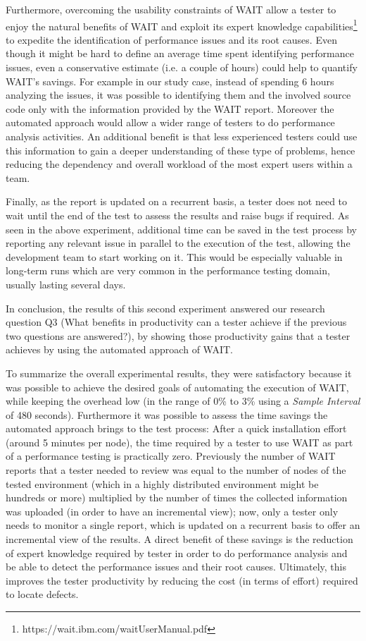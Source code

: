 \documentclass[runningheads,a4paper]{llncs}
\begin{document}
Furthermore, overcoming the usability constraints of WAIT allow a tester
to enjoy the natural benefits of WAIT and exploit its expert knowledge
capabilities\footnote{https://wait.ibm.com/waitUserManual.pdf} to expedite the
identification of performance issues and its root causes. Even though it
might be hard to define an average time spent identifying performance issues,
even a conservative estimate (i.e. a couple of hours) could help to
quantify WAIT's savings. For example in our study case, instead of spending 6
hours analyzing the issues, it was possible to identifying them and the involved
source code only with the information provided by the WAIT report. Moreover
the automated approach would allow a wider range of testers to do performance
analysis activities. An additional benefit is that less experienced testers
could use this information to gain a deeper understanding of these type of problems, 
hence reducing the dependency and overall workload of the most expert users
within a team.

Finally, as the report is updated on a recurrent basis, a tester does
not need to wait until the end of the test to assess the results and raise bugs
if required. As seen in the above experiment, additional time can be saved
in the test process by reporting any relevant issue in parallel to the
execution of the test, allowing the development team to start working on it.
This would be especially valuable in long-term runs which are very common in the 
performance testing domain, usually lasting several days.

In conclusion, the results of this second experiment answered our research
question Q3 (What benefits in productivity can a tester achieve if the previous
two questions are answered?), by showing those productivity gains that a tester
achieves by using the automated approach of WAIT.

To summarize the overall experimental results, they were satisfactory because it
was possible to achieve the desired goals of automating the execution of WAIT,
while keeping the overhead low (in the range of 0\% to 3\% using a \emph{Sample
Interval} of 480 seconds). Furthermore it was possible to assess the time
savings the automated approach brings to the test process: After a quick
installation effort (around 5 minutes per node), the time required by a tester
to use WAIT as part of a performance testing is practically zero. Previously the
number of WAIT reports that a tester needed to review was equal to the number of
nodes of the tested environment (which in a highly distributed environment
might be hundreds or more) multiplied by the number of times the collected
information was uploaded (in order to have an incremental view); now, only
a tester only needs to monitor a single report, which is updated on a recurrent
basis to offer an incremental view of the results. A direct benefit of these
savings is the reduction of expert knowledge required by tester in order to do
performance analysis and be able to detect the performance issues and their
root causes. Ultimately, this improves the tester productivity by reducing the
cost (in terms of effort) required to locate defects.
\end{document}
